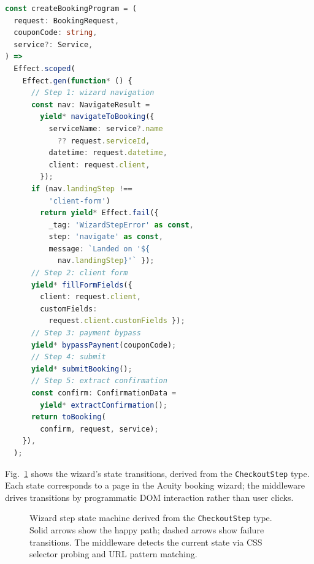 \documentclass[conference]{IEEEtran}
\begin{document}
\begin{lstlisting}[language=TypeScript,caption={Wizard step composition via \texttt{Effect.scoped} and \texttt{Effect.gen}},label={lst:booking}]
const createBookingProgram = (
  request: BookingRequest,
  couponCode: string,
  service?: Service,
) =>
  Effect.scoped(
    Effect.gen(function* () {
      // Step 1: wizard navigation
      const nav: NavigateResult =
        yield* navigateToBooking({
          serviceName: service?.name
            ?? request.serviceId,
          datetime: request.datetime,
          client: request.client,
        });
      if (nav.landingStep !==
          'client-form')
        return yield* Effect.fail({
          _tag: 'WizardStepError' as const,
          step: 'navigate' as const,
          message: `Landed on '${
            nav.landingStep}'` });
      // Step 2: client form
      yield* fillFormFields({
        client: request.client,
        customFields:
          request.client.customFields });
      // Step 3: payment bypass
      yield* bypassPayment(couponCode);
      // Step 4: submit
      yield* submitBooking();
      // Step 5: extract confirmation
      const confirm: ConfirmationData =
        yield* extractConfirmation();
      return toBooking(
        confirm, request, service);
    }),
  );
\end{lstlisting}

Fig.~\ref{fig:statemachine} shows the wizard's state transitions, derived from the \texttt{CheckoutStep} type. Each state corresponds to a page in the Acuity booking wizard; the middleware drives transitions by programmatic DOM interaction rather than user clicks.

\begin{figure}[t]
\centering
{}
\caption{Wizard step state machine derived from the \texttt{CheckoutStep} type. Solid arrows show the happy path; dashed arrows show failure transitions. The middleware detects the current state via CSS selector probing and URL pattern matching.}
\label{fig:statemachine}
\end{figure}
\end{document}
